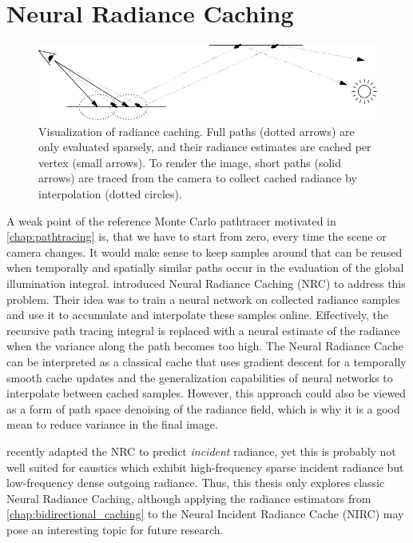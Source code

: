 
\chapter{Neural Radiance Caching}
\label{chap:nrc}
\begin{figure}[htb!]
    \centering
    \includegraphics{figures/asy/nrc.pdf}
    \caption{Visualization of radiance caching. Full paths (dotted arrows) are only evaluated sparsely, and their radiance estimates are cached per vertex (small arrows). To render the image, short paths (solid arrows) are traced from the camera to collect cached radiance by interpolation (dotted circles).}
    \label{fig:nrc_overview}
\end{figure}
A weak point of the reference Monte Carlo pathtracer motivated in \cref{chap:pathtracing} is, that we have to start from zero, every time the scene or camera changes.
It would make sense to keep samples around that can be reused when temporally and spatially similar paths occur in the evaluation of the global illumination integral.
\textcite{muller2021} introduced Neural Radiance Caching (NRC) to address this problem.
Their idea was to train a neural network on collected radiance samples and use it to accumulate and interpolate these samples online.
Effectively, the recursive path tracing integral is replaced with a neural estimate of the radiance when the variance along the path becomes too high.
The Neural Radiance Cache can be interpreted as a classical cache that uses gradient descent for a temporally smooth cache updates and the generalization capabilities of neural networks to interpolate between cached samples.
However, this approach could also be viewed as a form of path space denoising of the radiance field, which is why it is a good mean to reduce variance in the final image.

\textcite{dereviannykh2024} recently adapted the NRC to predict \emph{incident} radiance, yet this is probably not well suited for caustics which exhibit high-frequency sparse incident radiance but low-frequency dense outgoing radiance.
Thus, this thesis only explores classic Neural Radiance Caching, although applying the radiance estimators from \cref{chap:bidirectional_caching} to the Neural Incident Radiance Cache (NIRC) may pose an interesting topic for future research.

